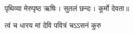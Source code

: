 \centerline{पृथिव्या  मेरुपृष्ठ  ऋषिः।  सुतलं  छन्दः।  कूर्मो  देवता॥}
{त्वं  च  धारय  मां  देवि  पवित्रं  चऽऽसनं  कुरु}
